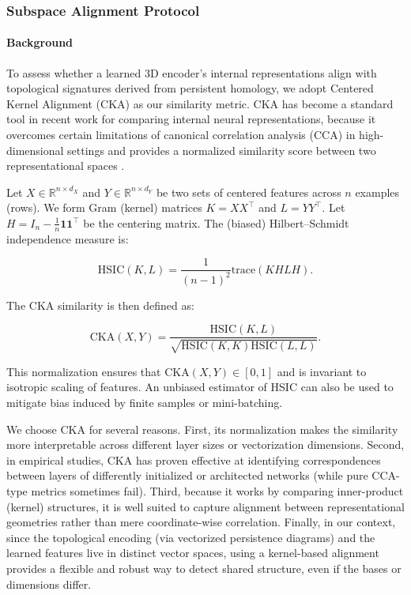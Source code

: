 \subsubsection{Subspace Alignment Protocol}
\label{sssec:subspace_alignment_protocol}

\paragraph{Background}
To assess whether a learned 3D encoder’s internal representations align with topological signatures derived from persistent homology, we adopt Centered Kernel Alignment (CKA) as our similarity metric. CKA has become a standard tool in recent work for comparing internal neural representations, because it overcomes certain limitations of canonical correlation analysis (CCA) in high-dimensional settings and provides a normalized similarity score between two representational spaces \cite{cka}.

Let $X\in \mathbb{R}^{n \times d_X}$ and $Y\in \mathbb{R}^{n \times d_Y}$ be two sets of centered features across $n$ examples (rows). We form Gram (kernel) matrices $K = X X^\top$ and $L = Y Y^\top$. Let $H = I_n - \frac1n \mathbf{1}\mathbf{1}^\top$ be the centering matrix. The (biased) Hilbert–Schmidt independence measure is: 

\begin{equation}
\mathrm{HSIC}(K,L) = \frac{1}{(n-1)^2} \mathrm{trace}(KHLH).
\end{equation}

The CKA similarity is then defined as:

\begin{equation}
\mathrm{CKA}(X,Y) = \frac{\mathrm{HSIC}(K,L)}{\sqrt{\mathrm{HSIC}(K,K) \mathrm{HSIC}(L,L)}}.
\end{equation}

This normalization ensures that $\mathrm{CKA}(X,Y)\in [0,1]$ and is invariant to isotropic scaling of features. An unbiased estimator of HSIC can also be used to mitigate bias induced by finite samples or mini-batching.

We choose CKA for several reasons. First, its normalization makes the similarity more interpretable across different layer sizes or vectorization dimensions. Second, in empirical studies, CKA has proven effective at identifying correspondences between layers of differently initialized or architected networks (while pure CCA-type metrics sometimes fail). Third, because it works by comparing inner-product (kernel) structures, it is well suited to capture alignment between representational geometries rather than mere coordinate-wise correlation. Finally, in our context, since the topological encoding (via vectorized persistence diagrams) and the learned features live in distinct vector spaces, using a kernel-based alignment provides a flexible and robust way to detect shared structure, even if the bases or dimensions differ.

